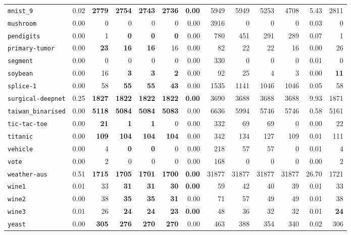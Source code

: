 \begin{tabular}{lrrrrrrrrrrrr}
\texttt{mnist\_9} & 0.02 & \textbf{2779} & \textbf{2754} & \textbf{2743} & \textbf{2736} & \textbf{0.00} & 5949 & 5949 & 5253 & 4708 & 5.43 & 2811\\
\texttt{mushroom} & 0.00 & 0 & 0 & 0 & 0 & 0.00 & 3916 & 0 & 0 & 0 & 0.03 & 0\\
\texttt{pendigits} & 0.00 & 1 & \textbf{0} & \textbf{0} & \textbf{0} & 0.00 & 780 & 451 & 291 & 289 & 0.07 & 1\\
\texttt{primary-tumor} & 0.00 & \textbf{23} & \textbf{16} & \textbf{16} & 16 & 0.00 & 82 & 22 & 22 & 16 & 0.00 & 26\\
\texttt{segment} & 0.00 & 0 & 0 & 0 & 0 & 0.00 & 330 & 0 & 0 & 0 & 0.01 & 0\\
\texttt{soybean} & 0.00 & 16 & \textbf{3} & \textbf{3} & \textbf{2} & 0.00 & 92 & 25 & 4 & 3 & 0.00 & \textbf{11}\\
\texttt{splice-1} & 0.00 & 58 & \textbf{55} & \textbf{55} & \textbf{43} & 0.00 & 1535 & 1141 & 1046 & 1046 & 0.05 & 58\\
\texttt{surgical-deepnet} & 0.25 & \textbf{1827} & \textbf{1822} & \textbf{1822} & \textbf{1822} & \textbf{0.00} & 3690 & 3688 & 3688 & 3688 & 9.93 & 1871\\
\texttt{taiwan\_binarised} & 0.00 & \textbf{5118} & \textbf{5084} & \textbf{5084} & \textbf{5083} & 0.00 & 6636 & 5994 & 5746 & 5746 & 0.58 & 5161\\
\texttt{tic-tac-toe} & 0.00 & \textbf{21} & \textbf{1} & \textbf{1} & 0 & 0.00 & 332 & 69 & 69 & 0 & 0.00 & 22\\
\texttt{titanic} & 0.00 & \textbf{109} & \textbf{104} & \textbf{104} & \textbf{104} & 0.00 & 342 & 134 & 127 & 109 & 0.01 & 111\\
\texttt{vehicle} & 0.00 & 4 & \textbf{0} & \textbf{0} & 0 & 0.00 & 218 & 57 & 57 & 0 & 0.01 & 4\\
\texttt{vote} & 0.00 & 2 & 0 & 0 & 0 & 0.00 & 168 & 0 & 0 & 0 & 0.00 & 2\\
\texttt{weather-aus} & 0.51 & \textbf{1715} & \textbf{1705} & \textbf{1701} & \textbf{1700} & \textbf{0.00} & 31877 & 31877 & 31877 & 31877 & 26.70 & 1721\\
\texttt{wine1} & 0.01 & 33 & \textbf{31} & \textbf{31} & \textbf{30} & \textbf{0.00} & 59 & 42 & 40 & 39 & 0.01 & 33\\
\texttt{wine2} & 0.00 & 38 & \textbf{35} & \textbf{35} & \textbf{31} & 0.00 & 71 & 57 & 49 & 49 & 0.01 & 38\\
\texttt{wine3} & 0.01 & 26 & \textbf{24} & \textbf{24} & \textbf{23} & \textbf{0.00} & 48 & 36 & 32 & 32 & 0.01 & \textbf{24}\\
\texttt{yeast} & 0.00 & \textbf{305} & \textbf{276} & \textbf{270} & \textbf{270} & 0.00 & 463 & 388 & 354 & 340 & 0.02 & 306\\
\bottomrule
\end{tabular}
